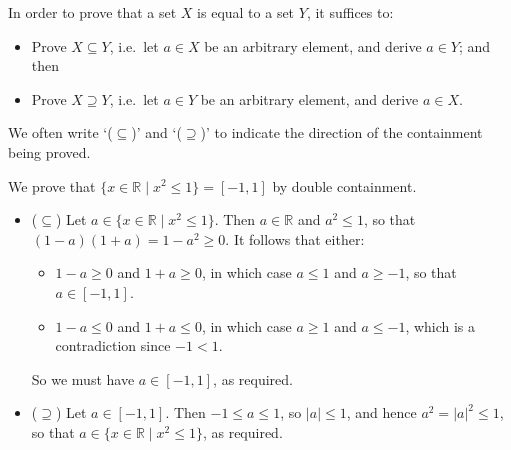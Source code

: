 \begin{strategy}
In order to prove that a set $X$ is equal to a set $Y$, it suffices to:
\begin{itemize}
\item Prove $X \subseteq Y$, i.e.\ let $a \in X$ be an arbitrary element, and derive $a \in Y$; and then
\item Prove $X \supseteq Y$, i.e.\ let $a \in Y$ be an arbitrary element, and derive $a \in X$.
\end{itemize}
We often write `($\subseteq$)' and `($\supseteq$)' to indicate the direction of the containment being proved.
\end{strategy}

\begin{example}
\label{exPositiveNegativeSetBuilderNotation}
We prove that $\{ x \in \mathbb{R} \mid x^2 \le 1 \} = [-1,1]$ by double containment.
\begin{itemize}
\item ($\subseteq$) Let $a \in \{ x \in \mathbb{R} \mid x^2 \le 1 \}$. Then $a \in \mathbb{R}$ and $a^2 \le 1$, so that $(1-a)(1+a) = 1-a^2 \ge 0$. It follows that either:
\begin{itemize}
\item $1-a \ge 0$ and $1+a \ge 0$, in which case $a \le 1$ and $a \ge -1$, so that $a \in [-1,1]$.
\item $1-a \le 0$ and $1+a \le 0$, in which case $a \ge 1$ and $a \le -1$, which is a contradiction since $-1 < 1$.
\end{itemize}
So we must have $a \in [-1,1]$, as required.

\item ($\supseteq$) Let $a \in [-1,1]$. Then $-1 \le a \le 1$, so $|a| \le 1$, and hence $a^2 = |a|^2 \le 1$, so that $a \in \{ x \in \mathbb{R} \mid x^2 \le 1 \}$, as required.
\end{itemize}
\end{example}

